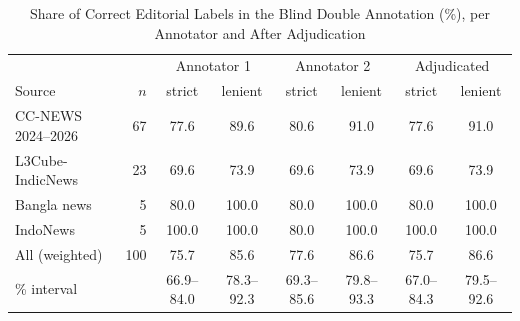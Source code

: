\documentclass[journal,onecolumn]{IEEEtran}
\begin{document}
\begin{table}[!htbp]
\caption{Share of Correct Editorial Labels in the Blind Double Annotation (\%), per Annotator and After Adjudication}
\label{tab:human}
\centering
\footnotesize
\setlength{\tabcolsep}{4pt}
\begin{tabular}{@{}lrcccccc@{}}
\toprule
 & & \multicolumn{2}{c}{Annotator 1} & \multicolumn{2}{c}{Annotator 2} & \multicolumn{2}{c}{Adjudicated} \\
\cmidrule(lr){3-4}\cmidrule(lr){5-6}\cmidrule(lr){7-8}
Source & $n$ & strict & lenient & strict & lenient & strict & lenient \\
\midrule
CC-NEWS 2024--2026 & 67 & 77.6 & 89.6 & 80.6 & 91.0 & 77.6 & 91.0 \\
L3Cube-IndicNews & 23 & 69.6 & 73.9 & 69.6 & 73.9 & 69.6 & 73.9 \\
Bangla news & 5 & 80.0 & 100.0 & 80.0 & 100.0 & 80.0 & 100.0 \\
IndoNews & 5 & 100.0 & 100.0 & 80.0 & 100.0 & 100.0 & 100.0 \\
\midrule
All (weighted) & 100 & 75.7 & 85.6 & 77.6 & 86.6 & 75.7 & 86.6 \\
\quad 95\% interval & & 66.9--84.0 & 78.3--92.3 & 69.3--85.6 & 79.8--93.3 & 67.0--84.3 & 79.5--92.6 \\
\bottomrule
\end{tabular}
\par\vspace{2pt}{\footnotesize Strict = the editorial label is the main topic chosen by the annotator. Lenient = the editorial label is among the topics that the annotator marked as central as the main topic. The overall shares weight each source by its share of the 8,650 editorial labels as in the audit.\par}
\end{table}
\end{document}
